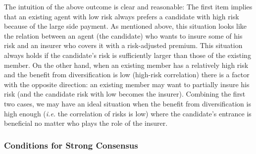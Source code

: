 \documentclass[fleqn,mnsc,nonblindrev]{informs4}
\begin{document}
The intuition of the above outcome is clear and reasonable: The first item implies that an existing agent with low risk always prefers a candidate with high risk because of the large side payment. As mentioned above, this situation looks like the relation between an agent (the candidate) who wants to insure some of his risk and an insurer who covers it with a risk-adjusted premium. This situation always holds if the candidate's risk is sufficiently larger than those of the existing member. On the other hand, when an existing member has a relatively high risk and the benefit from diversification is low (high-risk correlation) there is a factor with the opposite direction: an existing member may want to partially insure his risk (and the candidate risk with low becomes the insurer). Combining the first two cases, we may have an ideal situation when the benefit from diversification is high enough (\textit{i.e.} the correlation of risks is low) where the candidate's entrance is beneficial no matter who plays the role of the insurer.

\subsubsection*{Conditions for Strong Consensus}
\end{document}
